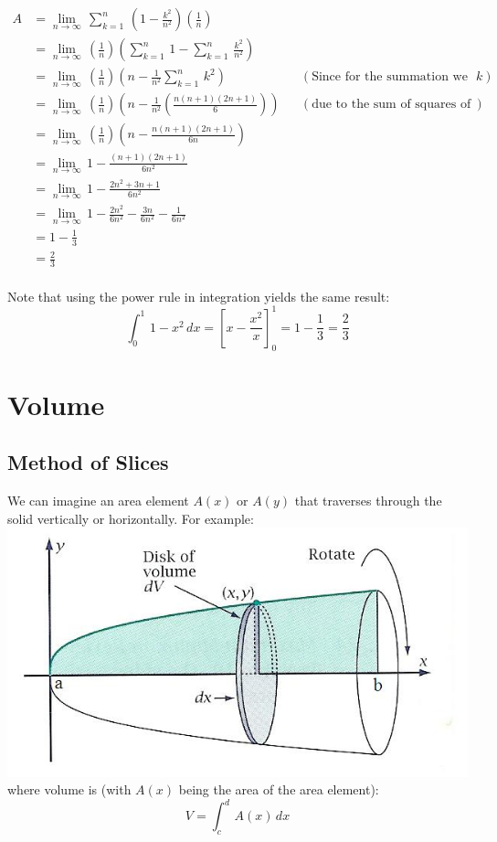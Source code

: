 \documentclass{article}
\begin{document}
\begin{align*}
    A &= \lim_{n \rightarrow \infty} \, \sum_{k=1}^{n} \, (1-\frac{k^2}{n^2})(\frac{1}{n}) \\
    &= \lim_{n \rightarrow \infty} \, (\frac{1}{n})( \sum_{k=1}^{n} \, 1 - \sum_{k=1}^{n} \, \frac{k^2}{n^2}) \\
    &= \lim_{n \rightarrow \infty} \, (\frac{1}{n})(n - \frac{1}{n^2} \sum_{k=1}^{n} \, k^2) && (\text{Since for the summation we only care about} \,k) \\
    &= \lim_{n \rightarrow \infty} \, (\frac{1}{n})(n - \frac{1}{n^2} (\frac{n(n+1)(2n+1)}{6})) && (\text{due to the sum of squares of natural numbers}) \\
    &= \lim_{n \rightarrow \infty} \, (\frac{1}{n})(n - \frac{n(n+1)(2n+1)}{6n}) \\
    &= \lim_{n \rightarrow \infty} \, 1 -\frac{(n+1)(2n+1)}{6n^2} \\
    &= \lim_{n \rightarrow \infty} \, 1 -\frac{2n^2+3n+1}{6n^2} \\
    &= \lim_{n \rightarrow \infty} \, 1 - \frac{2n^2}{6n^2} - \frac{3n}{6n^2} - \frac{1}{6n^2} \\
    &= 1 - \frac{1}{3} \\
    &= \frac{2}{3}
\end{align*}
\\
Note that using the power rule in integration yields the same result:
\[\int_{0}^{1} \, 1-x^2 \, dx = \left[x-\frac{x^2}{x}\right]_{0}^{1} = 1 - \frac{1}{3} = \frac{2}{3} \]

\section{Volume}
\subsection*{Method of Slices}
We can imagine an area element $A(x)$ or $A(y)$ that traverses through the solid vertically or horizontally. For example:
\\
\includegraphics[scale=0.6]{volume1.jpeg}
\\
where volume is (with $A(x)$ being the area of the area element):
\[V = \int_{c}^{d} \, A(x) \, dx \]
\end{document}
